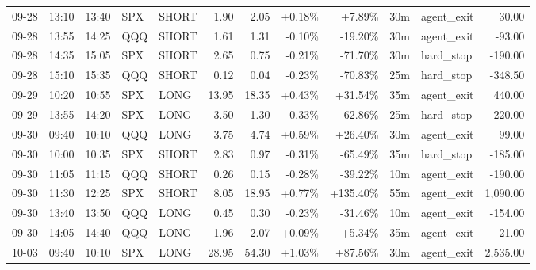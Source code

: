 \documentclass[11pt,a4paper,twoside]{article}
\begin{document}
\begin{center}
\begin{longtable}{>{\color{txtmain}}l l l l l r r r r r >{\color{txtmain}}l r}
09-28 & 13:10 & 13:40 & SPX & SHORT & 1.90 & 2.05 & \textcolor{wingreen}{+0.18\%} & \textcolor{wingreen}{+7.89\%} & 30m & agent\_exit & \textcolor{wingreen}{30.00} \\
09-28 & 13:55 & 14:25 & QQQ & SHORT & 1.61 & 1.31 & \textcolor{lossred}{-0.10\%} & \textcolor{lossred}{-19.20\%} & 30m & agent\_exit & \textcolor{lossred}{-93.00} \\
09-28 & 14:35 & 15:05 & SPX & SHORT & 2.65 & 0.75 & \textcolor{lossred}{-0.21\%} & \textcolor{lossred}{-71.70\%} & 30m & hard\_stop & \textcolor{lossred}{-190.00} \\
09-28 & 15:10 & 15:35 & QQQ & SHORT & 0.12 & 0.04 & \textcolor{lossred}{-0.23\%} & \textcolor{lossred}{-70.83\%} & 25m & hard\_stop & \textcolor{lossred}{-348.50} \\
09-29 & 10:20 & 10:55 & SPX & LONG & 13.95 & 18.35 & \textcolor{wingreen}{+0.43\%} & \textcolor{wingreen}{+31.54\%} & 35m & agent\_exit & \textcolor{wingreen}{440.00} \\
09-29 & 13:55 & 14:20 & SPX & LONG & 3.50 & 1.30 & \textcolor{lossred}{-0.33\%} & \textcolor{lossred}{-62.86\%} & 25m & hard\_stop & \textcolor{lossred}{-220.00} \\
09-30 & 09:40 & 10:10 & QQQ & LONG & 3.75 & 4.74 & \textcolor{wingreen}{+0.59\%} & \textcolor{wingreen}{+26.40\%} & 30m & agent\_exit & \textcolor{wingreen}{99.00} \\
09-30 & 10:00 & 10:35 & SPX & SHORT & 2.83 & 0.97 & \textcolor{lossred}{-0.31\%} & \textcolor{lossred}{-65.49\%} & 35m & hard\_stop & \textcolor{lossred}{-185.00} \\
09-30 & 11:05 & 11:15 & QQQ & SHORT & 0.26 & 0.15 & \textcolor{lossred}{-0.28\%} & \textcolor{lossred}{-39.22\%} & 10m & agent\_exit & \textcolor{lossred}{-190.00} \\
09-30 & 11:30 & 12:25 & SPX & SHORT & 8.05 & 18.95 & \textcolor{wingreen}{+0.77\%} & \textcolor{wingreen}{+135.40\%} & 55m & agent\_exit & \textcolor{wingreen}{1,090.00} \\
09-30 & 13:40 & 13:50 & QQQ & LONG & 0.45 & 0.30 & \textcolor{lossred}{-0.23\%} & \textcolor{lossred}{-31.46\%} & 10m & agent\_exit & \textcolor{lossred}{-154.00} \\
09-30 & 14:05 & 14:40 & QQQ & LONG & 1.96 & 2.07 & \textcolor{wingreen}{+0.09\%} & \textcolor{wingreen}{+5.34\%} & 35m & agent\_exit & \textcolor{wingreen}{21.00} \\
10-03 & 09:40 & 10:10 & SPX & LONG & 28.95 & 54.30 & \textcolor{wingreen}{+1.03\%} & \textcolor{wingreen}{+87.56\%} & 30m & agent\_exit & \textcolor{wingreen}{2,535.00} \\

\end{longtable}
\end{center}
\end{document}
